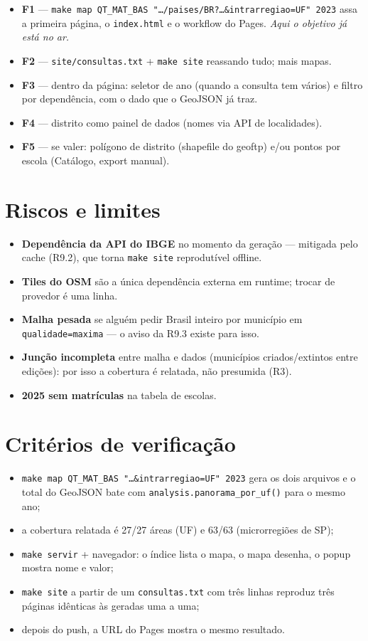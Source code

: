 \documentclass[11pt]{article}
\begin{document}
\begin{itemize}
\item \textbf{F1} — \texttt{make map QT\_MAT\_BAS "…/paises/BR?…\&intrarregiao=UF" 2023} assa a
primeira página, o \texttt{index.html} e o workflow do Pages. \emph{Aqui o objetivo já
está no ar.}
\item \textbf{F2} — \texttt{site/consultas.txt} + \texttt{make site} reassando tudo; mais mapas.
\item \textbf{F3} — dentro da página: seletor de ano (quando a consulta tem vários) e
filtro por dependência, com o dado que o GeoJSON já traz.
\item \textbf{F4} — distrito como painel de dados (nomes via API de localidades).
\item \textbf{F5} — se valer: polígono de distrito (shapefile do geoftp) e/ou pontos
por escola (Catálogo, export manual).
\end{itemize}
\section{Riscos e limites}
\label{sec:org2e8baf7}

\begin{itemize}
\item \textbf{Dependência da API do IBGE} no momento da geração — mitigada pelo cache
(R9.2), que torna \texttt{make site} reprodutível offline.
\item \textbf{Tiles do OSM} são a única dependência externa em runtime; trocar de
provedor é uma linha.
\item \textbf{Malha pesada} se alguém pedir Brasil inteiro por município em
\texttt{qualidade=maxima} — o aviso da R9.3 existe para isso.
\item \textbf{Junção incompleta} entre malha e dados (municípios criados/extintos entre
edições): por isso a cobertura é relatada, não presumida (R3).
\item \textbf{2025 sem matrículas} na tabela de escolas.
\end{itemize}
\section{Critérios de verificação}
\label{sec:org516ebe1}

\begin{itemize}
\item \texttt{make map QT\_MAT\_BAS "…\&intrarregiao=UF" 2023} gera os dois arquivos e o
total do GeoJSON bate com \texttt{analysis.panorama\_por\_uf()} para o mesmo ano;
\item a cobertura relatada é 27/27 áreas (UF) e 63/63 (microrregiões de SP);
\item \texttt{make servir} + navegador: o índice lista o mapa, o mapa desenha, o popup
mostra nome e valor;
\item \texttt{make site} a partir de um \texttt{consultas.txt} com três linhas reproduz três
páginas idênticas às geradas uma a uma;
\item depois do push, a URL do Pages mostra o mesmo resultado.
\end{itemize}
\end{document}
